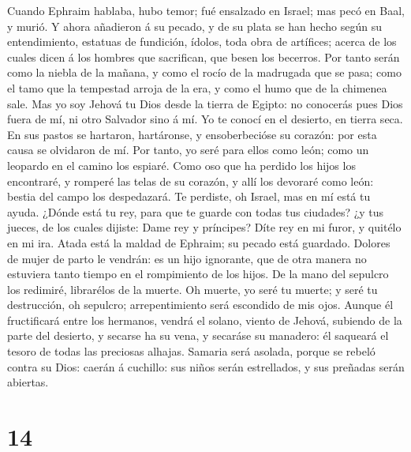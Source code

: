 Cuando Ephraim hablaba, hubo temor; fué ensalzado en
Israel; mas pecó en Baal, y murió.  Y ahora añadieron á su
pecado, y de su plata se han hecho según su entendimiento, estatuas de
fundición, ídolos, toda obra de artífices; acerca de los cuales dicen á
los hombres que sacrifican, que besen los becerros.  Por
tanto serán como la niebla de la mañana, y como el rocío de la madrugada
que se pasa; como el tamo que la tempestad arroja de la era, y como el
humo que de la chimenea sale.  Mas yo soy Jehová tu Dios
desde la tierra de Egipto: no conocerás pues Dios fuera de mí, ni otro
Salvador sino á mí.  Yo te conocí en el desierto, en
tierra seca.  En sus pastos se hartaron, hartáronse, y
ensoberbecióse su corazón: por esta causa se olvidaron de mí.
 Por tanto, yo seré para ellos como león; como un leopardo
en el camino los espiaré.  Como oso que ha perdido los
hijos los encontraré, y romperé las telas de su corazón, y allí los
devoraré como león: bestia del campo los despedazará.  Te
perdiste, oh Israel, mas en mí está tu ayuda.  ¿Dónde
está tu rey, para que te guarde con todas tus ciudades? ¿y tus jueces,
de los cuales dijiste: Dame rey y príncipes?  Díte rey en
mi furor, y quitélo en mi ira.  Atada está la maldad de
Ephraim; su pecado está guardado.  Dolores de mujer de
parto le vendrán: es un hijo ignorante, que de otra manera no estuviera
tanto tiempo en el rompimiento de los hijos.  De la mano
del sepulcro los redimiré, librarélos de la muerte. Oh muerte, yo seré
tu muerte; y seré tu destrucción, oh sepulcro; arrepentimiento será
escondido de mis ojos.  Aunque él fructificará entre los
hermanos, vendrá el solano, viento de Jehová, subiendo de la parte del
desierto, y secarse ha su vena, y secaráse su manadero: él saqueará el
tesoro de todas las preciosas alhajas.  Samaria será
asolada, porque se rebeló contra su Dios: caerán á cuchillo: sus niños
serán estrellados, y sus preñadas serán abiertas.

\hypertarget{section-13}{%
\section{14}\label{section-13}}


